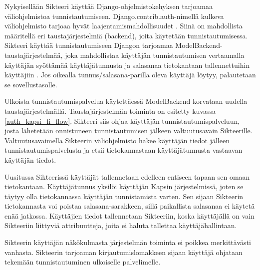 Nykyisellään Sikteeri käyttää Django-ohjelmistokehyksen tarjoamaa väliohjelmistoa tunnistautumiseen. Django.contrib.auth-nimellä kulkeva väliohjelmisto tarjoaa hyvät laajentamismahdollisuudet \cite{django_auth}. Siinä on mahdollista määritellä eri taustajärjestelmiä (backend), joita käytetään tunnistautumisessa. Sikteeri käyttää tunnistautumiseen Djangon tarjoamaa ModelBackend-taustajärjestelmää, joka mahdollistaa käyttäjän tunnistautumisen vertaamalla käyttäjän syöttämää käyttäjätunnusta ja salasanaa tietokantaan tallennettuihin käyttäjiin \cite{django_auth}. Jos oikealla tunnus/salasana-parilla oleva käyttäjä löytyy, palautetaan se sovellustasolle.

Ulkoista tunnistautumispalvelua käytettäessä ModelBackend korvataan uudella taustajärjestelmällä. Taustajärjestelmän toiminta on esitetty kuvassa \ref{auth_kapsi_fi_flow}. Sikteeri siis ohjaa käyttäjän tunnistautumispalveluun, josta lähetetään onnistuneen tunnistautumisen jälkeen valtuutusavain Sikteerille. Valtuutusavaimella Sikteerin väliohjelmisto hakee käyttäjän tiedot jälleen tunnistautumispalvelusta ja etsii tietokannastaan käyttäjätunnusta vastaavan käyttäjän tiedot.

Uusitussa Sikteerissä käyttäjät tallennetaan edelleen entiseen tapaan sen omaan tietokantaan. Käyttäjätunnus yksilöi käyttäjän Kapsin järjestelmissä, joten se täytyy olla tietokannassa käyttäjän tunnistamista varten. Sen sijaan Sikteerin tietokannasta voi poistaa salasana-sarakkeen, sillä paikallista salasanaa ei käytetä enää jatkossa. Käyttäjien tiedot tallennetaan Sikteeriin, koska käyttäjällä on vain Sikteeriin liittyviä attribuutteja, joita ei haluta tallettaa käyttäjähallintaan.

Sikteerin käyttäjän näkökulmasta järjestelmän toiminta ei poikkea merkittävästi vanhasta. Sikteerin tarjoaman kirjautumislomakkeen sijaan käyttäjä ohjataan tekemään tunnistautuminen ulkoiselle palvelimelle.